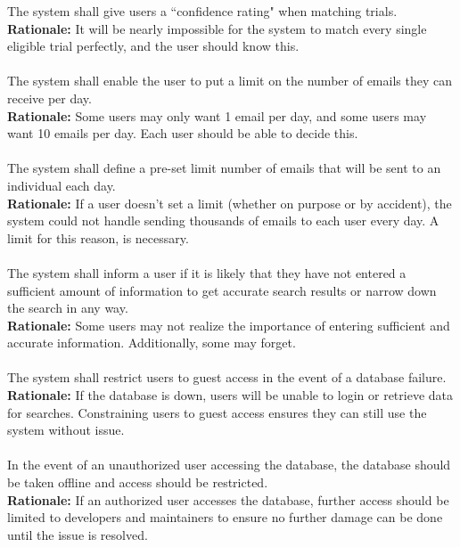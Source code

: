 \documentclass{article}
\begin{document}
The system shall give users a ``confidence rating" when matching trials.\\
\textbf{Rationale:} 
It will be nearly impossible for the system to match every single eligible trial perfectly, and the user should know this.\\~\\

The system shall enable the user to put a limit on the number of emails they can receive per day.\\
\textbf{Rationale:}
Some users may only want 1 email per day, and some users may want 10 emails per day. Each user should be able to decide this.\\~\\

The system shall define a pre-set limit number of emails that will be sent to an individual each day.\\
\textbf{Rationale:}
If a user doesn't set a limit (whether on purpose or by accident), the system could not handle sending thousands of emails to each user every day. A limit for this reason, is necessary.\\~\\

The system shall inform a user if it is likely that they have not entered a sufficient amount of information to get accurate search results or narrow down the search in any way.\\
\textbf{Rationale:}
Some users may not realize the importance of entering sufficient and accurate information. Additionally, some may forget.\\~\\

The system shall restrict users to guest access in the event of a database failure.\\
\textbf{Rationale:}
If the database is down, users will be unable to login or retrieve data for searches. Constraining users to guest access ensures they can still use the system without issue.\\~\\

In the event of an unauthorized user accessing the database, the database should be taken offline and access should be restricted.\\
\textbf{Rationale:}
If an authorized user accesses the database, further access should be limited to developers and maintainers to ensure no further damage can be done until the issue is resolved.\\~\\
\end{document}
